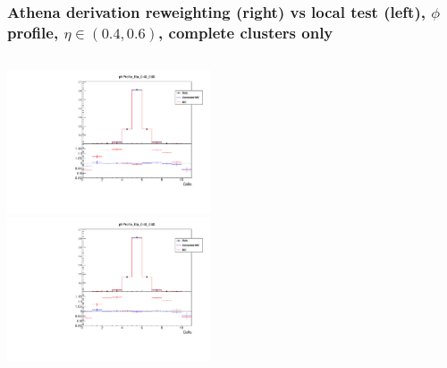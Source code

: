 \documentclass{beamer}
\begin{document}
\begin{frame}
\frametitle{Athena derivation reweighting (right) vs local test (left), $\phi$ profile, $\eta \in (0.4, 0.6)$, complete clusters only}

\begin{columns}[t]

\centering
\includegraphics[width=6cm]{phiProfile_Eta_4_6_Athena.pdf}\\
\centering
\includegraphics[width=6cm]{phiProfile_Rew_Eta_4_6_Local_Rew_noBS.pdf}\\
\end{columns}
\end{frame}
\end{document}

